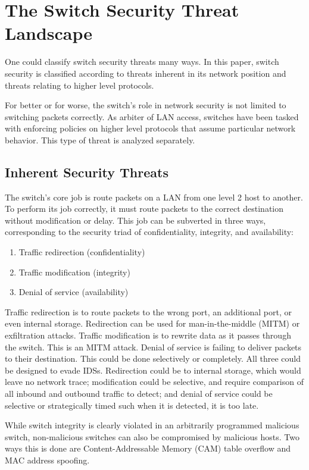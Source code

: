 \documentclass[journal]{IEEEtran}
\begin{document}
\section{The Switch Security Threat Landscape}
One could classify switch security threats many ways. In this paper, switch security is classified
according to threats inherent in its network position and threats relating to higher level
protocols.

For better or for worse, the switch's role in network security is not limited to switching packets
correctly. As arbiter of LAN access, switches have been tasked with enforcing policies on higher
level protocols that assume particular network behavior. This type of threat is analyzed separately.

\subsection{Inherent Security Threats}
The switch's core job is route packets on a LAN from one level 2 host to another. To perform its
job correctly, it must route packets to the correct destination without modification or delay. This
job can be subverted in three ways, corresponding to the security triad of confidentiality,
integrity, and availability:

\begin{enumerate}
  \item Traffic redirection (confidentiality) %
  \item Traffic modification (integrity)
  \item Denial of service (availability)
\end{enumerate}

Traffic redirection is to route packets to the wrong port, an additional port, or even internal
storage. Redirection can be used for man-in-the-middle (MITM) or exfiltration attacks. Traffic
modification is to rewrite data as it passes through the switch. This is an MITM attack. Denial of
service is failing to deliver packets to their destination. This could be done selectively or
completely. All three could be designed to evade IDSs. Redirection could be to internal storage,
which would leave no network trace; modification could be selective, and require comparison of all
inbound and outbound traffic to detect; and denial of service could be selective or strategically
timed such when it is detected, it is too late.

While switch integrity is clearly violated in an arbitrarily programmed malicious switch,
non-malicious switches can also be compromised by malicious hosts. Two ways this is done are
Content-Addressable Memory (CAM) table overflow and MAC address spoofing.
\end{document}
